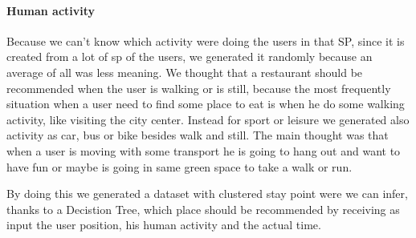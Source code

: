 \documentclass[../../main]{subfiles}
\begin{document}
\paragraph{Human activity}
Because we can't know which activity were doing the users in that SP, since it is created from a lot of sp of the users, we generated it randomly 
because an average of all was less meaning. We thought that a restaurant should be recommended when the user is walking or is still, because
the most frequently situation when a user need to find some place to eat is when he do some walking activity, like visiting the city center.
Instead for sport or leisure we generated also activity as car, bus or bike besides walk and still. The main thought was that when a user is moving with 
some transport he is going to hang out and want to have fun or maybe is going in same green space to take a walk or run.

By doing this we generated a dataset with clustered stay point were we can infer, thanks to a Decistion Tree, which place should be recommended by 
receiving as input the user position, his human activity and the actual time.
\end{document}
